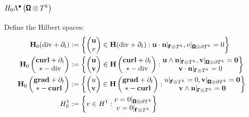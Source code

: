         \subsection*{$H_{0}\Lambda^{\bullet}\left(\pmb{\mathsf{\Omega}}\otimes T^{k}\right)$}
            Define the Hilbert spaces:
            \begin{align}
                \mathbf{H}_{0}(\mathrm{div} + \partial_{t})  &:=  \left\{\begin{pmatrix} \mathbf{u} \\ v \end{pmatrix} \in \mathbf{H}(\mathrm{div} + \partial_{t}) : \mathbf{u}\cdot\mathbf{n}|_{\pmb{\mathsf{\Gamma}}\otimes T^{k}}, v|_{\pmb{\mathsf{\Omega}}\otimes\partial T^{k}} = 0\right\}  \\
                \mathbf{H}_{0}\left(\begin{matrix} \mathbf{curl} + \partial_{t} \\ * - \mathrm{div} \end{matrix}\right)  &:=  \left\{\begin{pmatrix} \mathbf{u} \\ \mathbf{v} \end{pmatrix} \in \mathbf{H}\left(\begin{matrix} \mathbf{curl} + \partial_{t} \\ * - \mathrm{div} \end{matrix}\right) : \begin{matrix} \mathbf{u}\wedge\mathbf{n}|_{\pmb{\mathsf{\Gamma}}\otimes T^{k}}, \mathbf{v}|_{\pmb{\mathsf{\Omega}}\otimes\partial T^{k}} = \mathbf{0} \\ \mathbf{v}\cdot\mathbf{n}|_{\pmb{\mathsf{\Gamma}}\otimes T^{k}} = 0 \end{matrix}\right\}  \\
                \mathbf{H}_{0}\left(\begin{matrix} \mathbf{grad} + \partial_{t} \\ * - \mathbf{curl} \end{matrix}\right)  &:=  \left\{\begin{pmatrix} u \\ \mathbf{v} \end{pmatrix} \in \mathbf{H}\left(\begin{matrix} \mathbf{grad} + \partial_{t} \\ * - \mathbf{curl} \end{matrix}\right) : \begin{matrix} u|_{\pmb{\mathsf{\Gamma}}\otimes T^{k}} = 0, \mathbf{v}|_{\pmb{\mathsf{\Omega}}\otimes\partial T^{k}} = \mathbf{0} \\ \mathbf{v}\wedge\mathbf{n}|_{\pmb{\mathsf{\Gamma}}\otimes T^{k}} = \mathbf{0} \end{matrix}\right\}  \\
                H^{1}_{0}  &:=  \left\{v \in H^{1} : \begin{matrix} v = 0|_{\pmb{\mathsf{\Omega}}\otimes\partial T^{k}} \\ v = 0|_{\pmb{\mathsf{\Gamma}}\otimes T^{k}} \end{matrix}\right\}
            \end{align}
